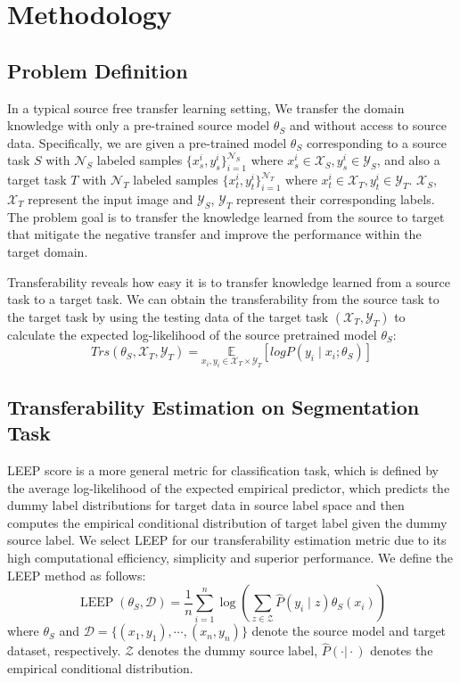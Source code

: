 \section{Methodology}
\subsection{Problem Definition}
In a typical source free transfer learning setting, We transfer the domain knowledge with only a pre-trained source model $\theta_S$ and without access to source data. Specifically, we are given a pre-trained model $\theta_S$ corresponding to a source task $S$ with $\mathcal{N}_S$ labeled samples $\{x_s^i,y_s^i \}_{i=1}^{\mathcal{N}_S}$ where $x_s^i \in \mathcal{X}_S, y_s^i \in \mathcal{Y}_S$, and also a target task $T$ with $\mathcal{N}_T$ labeled samples $\{x_t^i,y_t^i \}_{i=1}^{\mathcal{N}_T}$ where $x_t^i \in \mathcal{X}_T, y_t^i \in \mathcal{Y}_T$. $\mathcal{X}_S$, $\mathcal{X}_T$ represent the input image and $\mathcal{Y}_S$, $\mathcal{Y}_T$ represent their corresponding labels. The problem goal is to transfer the knowledge learned from the source to target that mitigate the negative transfer and improve the performance within the target domain.

Transferability reveals how easy it is to transfer knowledge learned from a source task to a target task. We can obtain the transferability from the source task to the target task by using the testing data of the target task $(\mathcal{X}_T, \mathcal{Y}_T)$ to calculate the expected log-likelihood of the source pretrained model $\theta_S$:
\begin{equation}
\label{Trans}
    Trs(\theta_S,\mathcal{X}_T,\mathcal{Y}_T) = \underset{x_i,y_i \in \mathcal{X}_T \times \mathcal{Y}_T}{\mathbb{E}} [logP( y_i\mid x_i;\theta_S)]
\end{equation}
\subsection{Transferability Estimation on Segmentation Task}
LEEP score is a more general metric for classification task, which is defined by the average log-likelihood of the expected empirical predictor, which predicts the dummy label distributions for target data in source label space and then computes the empirical conditional distribution of target label given the dummy source label. We select LEEP for our transferability estimation metric due to its high computational efficiency, simplicity and superior performance. We define the LEEP method as follows:
\begin{equation}
\label{LEEP}
    \operatorname{LEEP}(\theta_S,\mathcal{D}) = \frac{1}{n}\displaystyle\sum_{i = 1}^{n}\log(\displaystyle\sum_{z \in \mathcal{Z}}\hat{P}(y_i\mid z) \theta_S(x_i))
\end{equation}
where $\theta_S$ and $\mathcal{D} = \{(x_1, y_1),\cdots,(x_n, y_n)\}$ denote the source model and target dataset, respectively. $\mathcal{Z}$ denotes the dummy source label, $\hat{P}(\cdot\vert\cdot)$ denotes the empirical conditional distribution.


